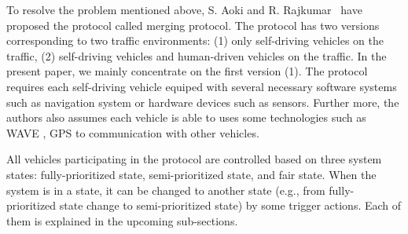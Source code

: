 \documentclass[10pt, conference, compsocconf]{IEEEtran}
\begin{document}
To resolve the problem mentioned above, 
S. Aoki and R. Rajkumar~\cite{10.1145/3055004.3055028} have proposed the protocol called merging protocol.
The protocol has two versions corresponding to two traffic environments: (1) only self-driving vehicles on the traffic, (2) self-driving vehicles and human-driven vehicles on the traffic.
In the present paper, we mainly concentrate on the first version (1). 
The protocol requires each self-driving vehicle equiped with several necessary software systems such as navigation system or hardware devices such as sensors.
Further more, the authors also assumes each vehicle is able to uses some technologies such as WAVE \cite{4346439,5888501}, GPS to communication with other vehicles.

All vehicles participating in the protocol are controlled based on three system states: fully-prioritized state, semi-prioritized state, and fair state. 
When the system is in a state, it can be changed to another state (e.g., from fully-prioritized state change to semi-prioritized state) by some trigger actions.
Each of them is explained in the upcoming sub-sections.
\end{document}
